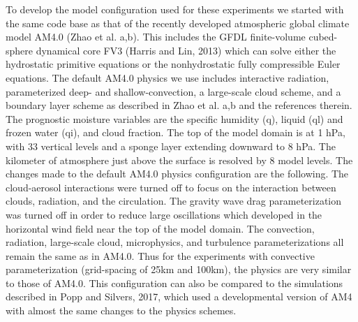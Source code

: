 \documentclass[11pt]{article}   	%
\begin{document}
To develop the model configuration used for these experiments we started with the same code base as that of the 
recently developed atmospheric global climate model AM4.0 
(Zhao et al. a,b).  This includes the GFDL finite-volume cubed-sphere dynamical core FV3 (Harris and Lin, 2013) 
which can solve either the hydrostatic primitive equations or the nonhydrostatic fully compressible Euler equations.  
The default AM4.0 physics we use includes interactive radiation, parameterized deep- and shallow-convection, 
a large-scale cloud scheme, and a boundary layer 
scheme as described in Zhao et al. a,b and the references therein.  The prognostic moisture variables are the specific 
humidity (q), liquid (ql) and frozen water (qi), and cloud fraction.  The top of the model domain is at 1 hPa, with 33 vertical 
levels and a sponge layer extending downward to 8 hPa.  The kilometer of atmosphere just above the surface is resolved by 
8 model levels.  The changes made to the default AM4.0 physics configuration are the following.  The cloud-aerosol 
interactions were turned off to focus on the interaction between clouds, radiation, and the circulation.  The gravity wave drag 
parameterization was turned off 
in order to reduce large oscillations which developed in the horizontal wind field near the top of the model domain.  
The convection, radiation, large-scale cloud, microphysics, and turbulence parameterizations all remain the same 
as in AM4.0.   Thus for the experiments with convective parameterization (grid-spacing of 25km and 100km), the 
physics are very similar to those of AM4.0.  This configuration can also be compared to the simulations described in 
Popp and Silvers, 2017, which used a developmental version of AM4 with almost the same changes to the physics
schemes.
\end{document}
